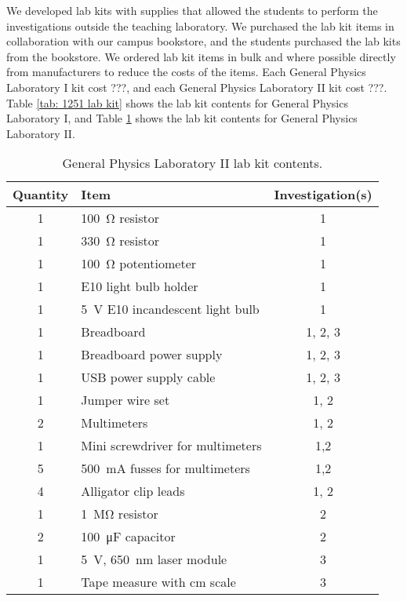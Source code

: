 \documentclass[aip, preprint, numerical]{revtex4-2}
\begin{document}
We developed lab kits with supplies that allowed the students to perform the investigations outside the teaching laboratory. We purchased the lab kit items in collaboration with our campus bookstore, and the students purchased the lab kits from the bookstore. We ordered lab kit items in bulk and where possible directly from manufacturers to reduce the costs of the items. Each General Physics Laboratory I kit cost ???, and each General Physics Laboratory II kit cost ???. Table \ref{tab: 1251 lab kit} shows the lab kit contents for General Physics Laboratory I, and Table \ref{tab: 1261 lab kit} shows the lab kit contents for General Physics Laboratory II.

 \begin{table}
    \caption{\label{tab: 1261 lab kit} General Physics Laboratory II lab kit contents.}
        \begin{tabular}{clc}
            \hline\hline
            Quantity & Item & Investigation(s)\\
            \hline
            1 & \SI{100}{\ohm} resistor & 1 \\
            1 & \SI{330}{\ohm} resistor & 1 \\
            1 &  \SI{100}{\ohm} potentiometer & 1 \\
            1 & E10 light bulb holder & 1 \\
            1 & \SI{5}{V} E10 incandescent light bulb & 1 \\
            1 & Breadboard & 1, 2, 3 \\
            1 & Breadboard power supply & 1, 2, 3 \\
            1 & USB power supply cable & 1, 2, 3 \\
            1 & Jumper wire set & 1, 2 \\
            2 & Multimeters & 1, 2 \\
            1 & Mini screwdriver for multimeters & 1,2 \\
            5 & \SI{500}{mA} fusses for multimeters & 1,2 \\
            4 & Alligator clip leads & 1, 2 \\
            1 & \SI{1}{\mega\ohm} resistor & 2 \\
            2 & \SI{100}{\micro\farad} capacitor & 2 \\
            1 & \SI{5}{V}, \SI{650}{nm} laser module & 3 \\
            1 & Tape measure with cm scale & 3 \\            
            \hline\hline
        \end{tabular}
\end{table}




\end{document}
